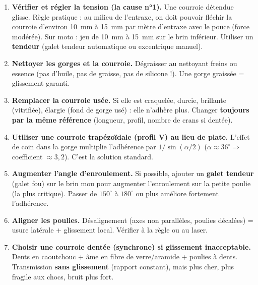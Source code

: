 \documentclass[11pt]{article}
\begin{document}
\begin{methode}
\begin{enumerate}
\item \textbf{Vérifier et régler la tension (la cause n°1).} Une courroie détendue glisse. Règle pratique : au milieu de l'entraxe, on doit pouvoir fléchir la courroie d'environ \SI{10}{mm} à \SI{15}{mm} par mètre d'entraxe avec le pouce (force modérée). Sur moto : jeu de \SI{10}{mm} à \SI{15}{mm} sur le brin inférieur. Utiliser un \textbf{tendeur} (galet tendeur automatique ou excentrique manuel).
\item \textbf{Nettoyer les gorges et la courroie.} Dégraisser au nettoyant freins ou essence (pas d'huile, pas de graisse, pas de silicone !). Une gorge graissée = glissement garanti.
\item \textbf{Remplacer la courroie usée.} Si elle est craquelée, durcie, brillante (vitrifiée), élargie (fond de gorge usé) : elle n'adhère plus. Changer \textbf{toujours par la même référence} (longueur, profil, nombre de crans si dentée).
\item \textbf{Utiliser une courroie trapézoïdale (profil V) au lieu de plate.} L'effet de coin dans la gorge multiplie l'adhérence par $1/\sin(\alpha/2)$ ($\alpha \approx 36^\circ \Rightarrow$ coefficient $\approx 3,2$). C'est la solution standard.
\item \textbf{Augmenter l'angle d'enroulement.} Si possible, ajouter un \textbf{galet tendeur} (galet fou) sur le brin mou pour augmenter l'enroulement sur la petite poulie (la plus critique). Passer de $150^\circ$ à $180^\circ$ ou plus améliore fortement l'adhérence.
\item \textbf{Aligner les poulies.} Désalignement (axes non parallèles, poulies décalées) = usure latérale + glissement local. Vérifier à la règle ou au laser.
\item \textbf{Choisir une courroie dentée (synchrone) si glissement inacceptable.} Dents en caoutchouc + âme en fibre de verre/aramide + poulies à dents. Transmission \textbf{sans glissement} (rapport constant), mais plus cher, plus fragile aux chocs, bruit plus fort.
\end{enumerate}
\end{methode}
\end{document}
